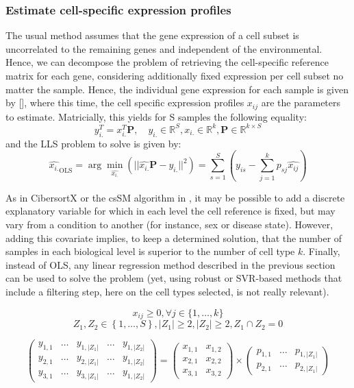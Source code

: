 \subsubsection{Estimate cell-specific expression profiles}
\label{estimate-cell-specific-expression-profiles}

The usual method assumes that the gene expression of a cell subset is
uncorrelated to the remaining genes and independent of the
environmental. Hence, we can decompose the problem of retrieving the
cell-specific reference matrix for each gene, considering additionally
fixed expression per cell subset no matter the sample. Hence, the
individual gene expression for each sample is given by {[}{]}, where
this time, the cell specific expression profiles \(x_{ij}\) are the
parameters to estimate. Matricially, this yields for S samples the
following equality: \[
y_{i.}^T=x_{i.}^T \mathbf{P} , \quad y_{i.} \in \mathbb{R}^S, x_{i.} \in \mathbb{R}^{k}, \mathbf{P} \in \mathbb{R}^{k \times S}
\] and the LLS problem to solve is given by: \[
\hat{x_{i.}}_{\text{OLS}} = \arg \min_{\hat{x_{i.}}} \left( ||\hat{x_{i.}} \mathbf{P} - y_{i.}||^2 \right) = \sum_{s=1}^S \left( y_{is} - \sum_{j=1}^k p_{sj}\hat{x_{ij}} \right)
\]

As in CibersortX \autocite{newman_etal19} or the csSM algorithm in
\autocite{shen-orr_etal10}, it may
be possible to add a discrete explanatory variable for which in each
level the cell reference is fixed, but may vary from a condition to
another (for instance, sex or disease state). However, adding this
covariate implies, to keep a determined solution, that the number of
samples in each biological level is superior to the number of cell type
\(k\). Finally, instead of OLS, any linear regression method described
in the previous section can be used to solve the problem (yet, using
robust or SVR-based methods that include a filtering step, here on the
cell types selected, is not really relevant).

\[
x_{ij} \ge 0, \forall j \in \{1, \ldots, k\}
\] \[
Z_1, Z_2 \in \left\{1, \ldots, S \right\}, |Z_1| \ge 2, |Z_2| \ge 2, Z_1 \cap Z_2 =0
\]

\[
\begin{pmatrix}
y_{1, 1} & \ldots & y_{1, |Z_1|} & \ldots & y_{1, |Z_2|}\\
y_{2, 1} & \ldots & y_{2, |Z_1|} & \ldots & y_{1, |Z_2|}\\
y_{3,1} & \ldots & y_{3, |Z_1|} & \ldots & y_{1, |Z_2|}
\end{pmatrix}
=
\begin{pmatrix}
x_{1, 1} &  x_{1, 2}\\
x_{2,1} &  x_{2, 2} \\
x_{3,1} &  x_{3, 2}
\end{pmatrix}
\times
\begin{pmatrix}
p_{1, 1} & \ldots & p_{1,|Z_1|}\\
p_{2,1} & \ldots & p_{2,|Z_1|}
\end{pmatrix}
\]


